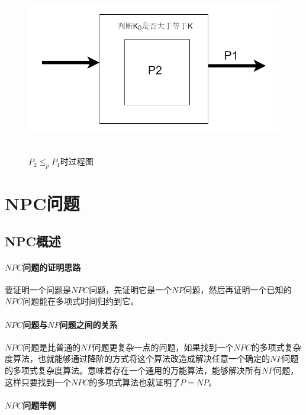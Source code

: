 		\begin{figure}[ht]
		\begin{minipage}[t]{1\linewidth}
			\centering
			\includegraphics[width=15cm,height=7.5cm]{image/P_NP3.png}
			\caption{$P_2\leq_pP_1$时过程图}\label{fig:P2-leq-P1}
		\end{minipage}
	\end{figure}
	
\newpage
	\section{NPC问题}
	\subsection{NPC概述}

\paragraph*{$NPC$问题的证明思路}

	
要证明一个问题是$NPC$问题，先证明它是一个$NP$问题，然后再证明一个已知的$NPC$问题能在多项式时间归约到它。

\paragraph*{$NPC$问题与$NP$问题之间的关系}


$NPC$问题是比普通的$NP$问题更复杂一点的问题，如果找到一个$NPC$的多项式复杂度算法，也就能够通过降阶的方式将这个算法改造成解决任意一个确定的$NP$问题的多项式复杂度算法。意味着存在一个通用的万能算法，能够解决所有$NP$问题，这样只要找到一个$NPC$的多项式算法也就证明了$P=NP$。
	
\paragraph*{$NPC$问题举例}
	\subparagraph*{}
	
